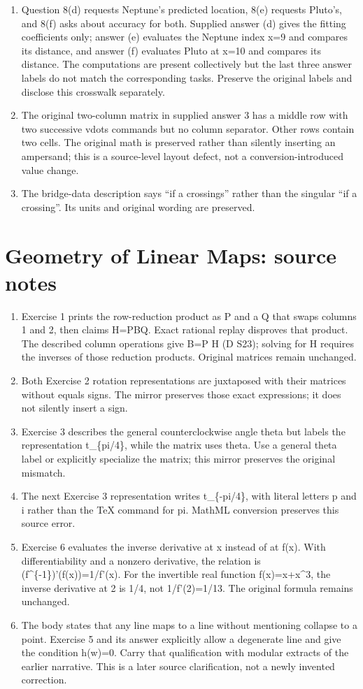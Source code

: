 \begin{enumerate}
\item Question 8(d) requests Neptune’s predicted location, 8(e) requests Pluto’s, and 8(f) asks about accuracy for both. Supplied answer (d) gives the fitting coefficients only; answer (e) evaluates the Neptune index x=9 and compares its distance, and answer (f) evaluates Pluto at x=10 and compares its distance. The computations are present collectively but the last three answer labels do not match the corresponding tasks. Preserve the original labels and disclose this crosswalk separately.
\item The original two-column matrix in supplied answer 3 has a middle row with two successive vdots commands but no column separator. Other rows contain two cells. The original math is preserved rather than silently inserting an ampersand; this is a source-level layout defect, not a conversion-introduced value change.
\item The bridge-data description says “if a crossings” rather than the singular “if a crossing”. Its units and original wording are preserved.
\end{enumerate}
\section*{Geometry of Linear Maps: source notes}
\begin{enumerate}
\item Exercise 1 prints the row-reduction product as P and a Q that swaps columns 1 and 2, then claims H=PBQ. Exact rational replay disproves that product. The described column operations give B=P H (D S23); solving for H requires the inverses of those reduction products. Original matrices remain unchanged.
\item Both Exercise 2 rotation representations are juxtaposed with their matrices without equals signs. The mirror preserves those exact expressions; it does not silently insert a sign.
\item Exercise 3 describes the general counterclockwise angle theta but labels the representation t\_\{pi/4\}, while the matrix uses theta. Use a general theta label or explicitly specialize the matrix; this mirror preserves the original mismatch.
\item The next Exercise 3 representation writes t\_\{-pi/4\}, with literal letters p and i rather than the TeX command for pi. MathML conversion preserves this source error.
\item Exercise 6 evaluates the inverse derivative at x instead of at f(x). With differentiability and a nonzero derivative, the relation is (f\textasciicircum{}\{-1\})'(f(x))=1/f'(x). For the invertible real function f(x)=x+x\textasciicircum{}3, the inverse derivative at 2 is 1/4, not 1/f'(2)=1/13. The original formula remains unchanged.
\item The body states that any line maps to a line without mentioning collapse to a point. Exercise 5 and its answer explicitly allow a degenerate line and give the condition h(w)=0. Carry that qualification with modular extracts of the earlier narrative. This is a later source clarification, not a newly invented correction.
\end{enumerate}
